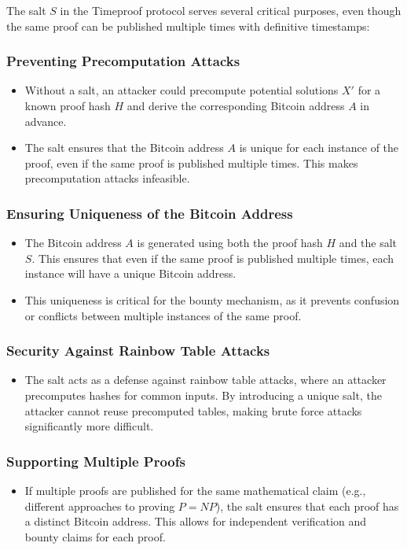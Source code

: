 \documentclass[12pt]{report}
\begin{document}
The salt \( S \) in the Timeproof protocol serves several critical purposes, even though the same proof can be published multiple times with definitive timestamps:

\subsubsection{Preventing Precomputation Attacks}
\begin{itemize}
    \item Without a salt, an attacker could precompute potential solutions \( X' \) for a known proof hash \( H \) and derive the corresponding Bitcoin address \( A \) in advance.
    \item The salt ensures that the Bitcoin address \( A \) is unique for each instance of the proof, even if the same proof is published multiple times. This makes precomputation attacks infeasible.
\end{itemize}

\subsubsection{Ensuring Uniqueness of the Bitcoin Address}
\begin{itemize}
    \item The Bitcoin address \( A \) is generated using both the proof hash \( H \) and the salt \( S \). This ensures that even if the same proof is published multiple times, each instance will have a unique Bitcoin address.
    \item This uniqueness is critical for the bounty mechanism, as it prevents confusion or conflicts between multiple instances of the same proof.
\end{itemize}

\subsubsection{Security Against Rainbow Table Attacks}
\begin{itemize}
    \item The salt acts as a defense against rainbow table attacks, where an attacker precomputes hashes for common inputs. By introducing a unique salt, the attacker cannot reuse precomputed tables, making brute force attacks significantly more difficult.
\end{itemize}

\subsubsection{Supporting Multiple Proofs}
\begin{itemize}
    \item If multiple proofs are published for the same mathematical claim (e.g., different approaches to proving \( P = NP \)), the salt ensures that each proof has a distinct Bitcoin address. This allows for independent verification and bounty claims for each proof.
\end{itemize}
\end{document}
